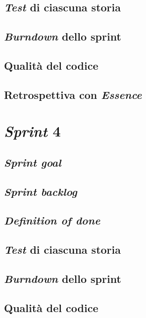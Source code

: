 \documentclass{article}
\begin{document}
\subsection{\emph{Test} di ciascuna storia}

\subsection{\emph{Burndown} dello sprint}

\subsection{Qualità del codice}

\subsection{Retrospettiva con \emph{Essence}}

\section{\emph{Sprint} 4}

\subsection{\emph{Sprint goal}}

\subsection{\emph{Sprint backlog}}

\subsection{\emph{Definition of done}}

\subsection{\emph{Test} di ciascuna storia}

\subsection{\emph{Burndown} dello sprint}

\subsection{Qualità del codice}
\end{document}
